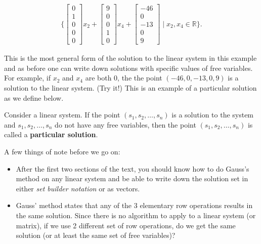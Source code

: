 \begin{example}
\begin{align*}
\{ \begin{bmatrix}
0 \\ 1 \\ 0 \\ 0 \\0
\end{bmatrix} x_2 +
\begin{bmatrix}
9 \\ 0 \\ 0 \\ 1 \\ 0
\end{bmatrix} x_4 +
\begin{bmatrix}
-46 \\ 0  \\ -13 \\ 0 \\ 9
\end{bmatrix} \;  | \; x_2, x_4 \in \mathbb{R} \}.
\end{align*}

This is the most general form of the solution to the linear system in this example and as before one can write down solutions with specific values of free variables.  For example, if $x_2$ and $x_4$ are both 0, the the point $(-46,0,-13,0,9)$ is a solution to the linear system.  (Try it!)  This is an example of a particular solution as we define below.


 \end{example}

\begin{definition}
Consider a linear system.  If the point $(s_1,s_2,\ldots,s_n)$ is a solution to the system and $s_1, s_2, \ldots, s_n$ do not have any free variables, then the point $(s_1,s_2,\ldots,s_n)$ is called a \textbf{particular solution}.
\end{definition}



A few things of note before we go on:

\begin{itemize}
\item After the first two sections of the text, you should know how to do Gauss's method on any linear system and be able to write down the solution set in either \emph{set builder notation} or as vectors.

\item Gauss' method states that any of the 3 elementary row operations results in the same solution.  Since there is no algorithm to apply to a linear system (or matrix), if we use 2 different set of row operations, do we get the same solution (or at least the same set of free variables)?
\end{itemize}

